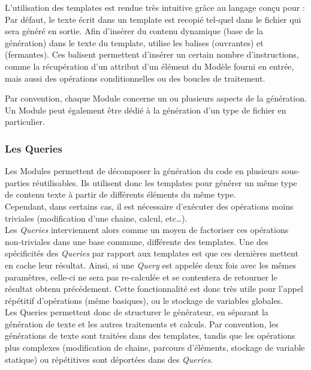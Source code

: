 L'utilisation des templates est rendue très intuitive grâce au langage conçu pour \kwacceleo{} : Par défaut, le texte écrit dans un template est recopié tel-quel dans le fichier qui sera généré en sortie. Afin d'insérer du contenu dynamique (base de la génération) dans le texte du template, \kwacceleo{} utilise les balises \guim{\textbf{[}} (ouvrantes) et \guim{\textbf{/]}} (fermantes). Ces balisent permettent d'insérer un certain nombre d'instructions, comme la récupération d'un attribut d'un élément du Modèle fourni en entrée, mais aussi des opérations conditionnelles ou des boucles de traitement.

Par convention, chaque Module concerne un ou plusieurs aspects de la génération. Un Module peut également être dédié à la génération d'un type de fichier en particulier.



\subsubsection{Les Queries}

Les Modules permettent de décomposer la génération du code en plusieurs sous-parties réutilisables. Ils utilisent donc les templates pour générer un même type de contenu texte à partir de différents éléments du même type.\\
Cependant, dans certains cas, il est nécessaire d'exécuter des opérations moins triviales (modification d'une chaine, calcul, etc\dots).\\
Les \textit{Queries} interviennent alors comme un moyen de factoriser ces opérations non-triviales dans une base commune, différente des templates.
Une des spécificités des \textit{Queries} par rapport aux templates est que ces dernières mettent en cache leur résultat. Ainsi, si une \textit{Query} est appelée deux fois avec les mêmes paramètres, celle-ci ne sera pas re-calculée et se contentera de retourner le résultat obtenu précédement. Cette fonctionnalité est donc très utile pour l'appel répétitif d'opérations (même basiques), ou le stockage de variables globales.\\
Les Queries permettent donc de structurer le générateur, en séparant la génération de texte et les autres traitements et calculs. Par convention, les générations de texte sont traitées dans des templates, tandis que les opérations plus complexes (modification de chaine, parcours d'éléments, stockage de variable statique) ou répétitives sont déportées dans des \textit{Queries}.

